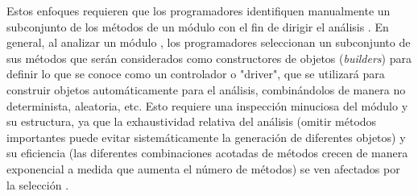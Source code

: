 











Estos enfoques  requieren que los
programadores identifiquen manualmente un subconjunto de los métodos de un
módulo con el fin de dirigir el análisis . En general, al analizar un módulo
,
los programadores seleccionan un subconjunto de sus métodos que serán
considerados como constructores de objetos (\emph{builders}) para definir lo que
se conoce como un controlador o "driver", que se utilizará para construir
objetos automáticamente para el análisis, combinándolos de manera no
determinista, aleatoria, etc. Esto requiere una inspección minuciosa del módulo
y su estructura, ya que la exhaustividad relativa del análisis (omitir métodos
importantes puede evitar sistemáticamente la generación de diferentes objetos) y
su eficiencia (las diferentes combinaciones acotadas de métodos crecen de manera
exponencial a medida que aumenta el número de métodos) se ven afectados por la
selección .




